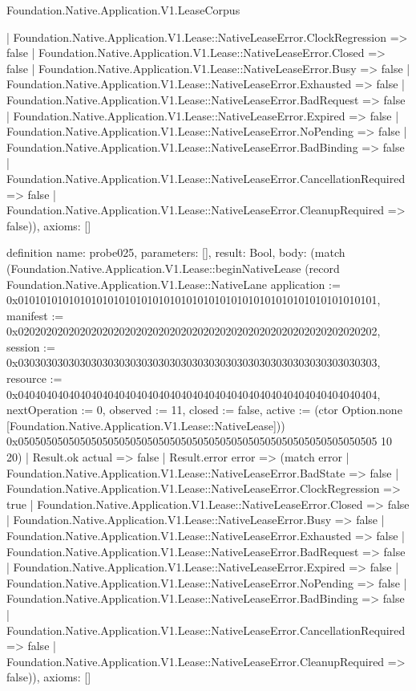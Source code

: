 \begin{lexlean}{Foundation.Native.Application.V1.LeaseCorpus}
\begin{semanticmodule}
{      | Foundation.Native.Application.V1.Lease::NativeLeaseError.ClockRegression => false
      | Foundation.Native.Application.V1.Lease::NativeLeaseError.Closed => false
      | Foundation.Native.Application.V1.Lease::NativeLeaseError.Busy => false
      | Foundation.Native.Application.V1.Lease::NativeLeaseError.Exhausted => false
      | Foundation.Native.Application.V1.Lease::NativeLeaseError.BadRequest => false
      | Foundation.Native.Application.V1.Lease::NativeLeaseError.Expired => false
      | Foundation.Native.Application.V1.Lease::NativeLeaseError.NoPending => false
      | Foundation.Native.Application.V1.Lease::NativeLeaseError.BadBinding => false
      | Foundation.Native.Application.V1.Lease::NativeLeaseError.CancellationRequired => false
      | Foundation.Native.Application.V1.Lease::NativeLeaseError.CleanupRequired => false)),
  axioms: []
}

definition{
  name: probe025,
  parameters: [],
  result: Bool,
  body: (match (Foundation.Native.Application.V1.Lease::beginNativeLease (record Foundation.Native.Application.V1.Lease::NativeLane {application := 0x0101010101010101010101010101010101010101010101010101010101010101, manifest := 0x0202020202020202020202020202020202020202020202020202020202020202, session := 0x0303030303030303030303030303030303030303030303030303030303030303, resource := 0x0404040404040404040404040404040404040404040404040404040404040404, nextOperation := 0, observed := 11, closed := false, active := (ctor Option.none [Foundation.Native.Application.V1.Lease::NativeLease])}) 0x0505050505050505050505050505050505050505050505050505050505050505 10 20)
    | Result.ok actual => false
    | Result.error error => (match error
      | Foundation.Native.Application.V1.Lease::NativeLeaseError.BadState => false
      | Foundation.Native.Application.V1.Lease::NativeLeaseError.ClockRegression => true
      | Foundation.Native.Application.V1.Lease::NativeLeaseError.Closed => false
      | Foundation.Native.Application.V1.Lease::NativeLeaseError.Busy => false
      | Foundation.Native.Application.V1.Lease::NativeLeaseError.Exhausted => false
      | Foundation.Native.Application.V1.Lease::NativeLeaseError.BadRequest => false
      | Foundation.Native.Application.V1.Lease::NativeLeaseError.Expired => false
      | Foundation.Native.Application.V1.Lease::NativeLeaseError.NoPending => false
      | Foundation.Native.Application.V1.Lease::NativeLeaseError.BadBinding => false
      | Foundation.Native.Application.V1.Lease::NativeLeaseError.CancellationRequired => false
      | Foundation.Native.Application.V1.Lease::NativeLeaseError.CleanupRequired => false)),
  axioms: []
}


\end{semanticmodule}
\end{lexlean}
